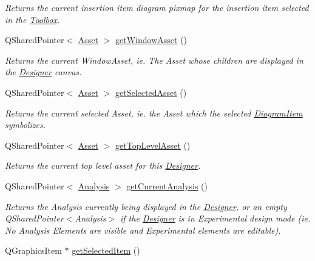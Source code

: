 \begin{DoxyCompactItemize}
\begin{DoxyCompactList}\small\item\em Returns the current insertion item diagram pixmap for the insertion item selected in the \hyperlink{class_toolbox}{Toolbox}. \end{DoxyCompactList}\item 
\hypertarget{class_editor_state_a9df7ef39d6c8fa0e23523d1b39c77175}{Q\-Shared\-Pointer$<$ \hyperlink{class_picto_1_1_asset}{Asset} $>$ \hyperlink{class_editor_state_a9df7ef39d6c8fa0e23523d1b39c77175}{get\-Window\-Asset} ()}\label{class_editor_state_a9df7ef39d6c8fa0e23523d1b39c77175}

\begin{DoxyCompactList}\small\item\em Returns the current Window\-Asset, ie. The Asset whose children are displayed in the \hyperlink{class_designer}{Designer} canvas. \end{DoxyCompactList}\item 
\hypertarget{class_editor_state_a73361dfdbd2d8883a420cc8f2f9b934b}{Q\-Shared\-Pointer$<$ \hyperlink{class_picto_1_1_asset}{Asset} $>$ \hyperlink{class_editor_state_a73361dfdbd2d8883a420cc8f2f9b934b}{get\-Selected\-Asset} ()}\label{class_editor_state_a73361dfdbd2d8883a420cc8f2f9b934b}

\begin{DoxyCompactList}\small\item\em Returns the current selected Asset, ie. the Asset which the selected \hyperlink{class_diagram_item}{Diagram\-Item} symbolizes. \end{DoxyCompactList}\item 
Q\-Shared\-Pointer$<$ \hyperlink{class_picto_1_1_asset}{Asset} $>$ \hyperlink{class_editor_state_ace3a4785e22a4fa4132d9c6c0f8dad53}{get\-Top\-Level\-Asset} ()
\begin{DoxyCompactList}\small\item\em Returns the current top level asset for this \hyperlink{class_designer}{Designer}. \end{DoxyCompactList}\item 
\hypertarget{class_editor_state_a921986c35f0d332c428048993f13700a}{Q\-Shared\-Pointer$<$ \hyperlink{class_picto_1_1_analysis}{Analysis} $>$ \hyperlink{class_editor_state_a921986c35f0d332c428048993f13700a}{get\-Current\-Analysis} ()}\label{class_editor_state_a921986c35f0d332c428048993f13700a}

\begin{DoxyCompactList}\small\item\em Returns the Analysis currently being displayed in the \hyperlink{class_designer}{Designer}, or an empty Q\-Shared\-Pointer$<$\-Analysis$>$ if the \hyperlink{class_designer}{Designer} is in Experimental design mode (ie. No Analysis Elements are visible and Experimental elements are editable). \end{DoxyCompactList}\item 
\hypertarget{class_editor_state_acf9f71ae95321e69934d76ee87b79980}{Q\-Graphics\-Item $\ast$ \hyperlink{class_editor_state_acf9f71ae95321e69934d76ee87b79980}{get\-Selected\-Item} ()}\label{class_editor_state_acf9f71ae95321e69934d76ee87b79980}


\end{DoxyCompactItemize}
